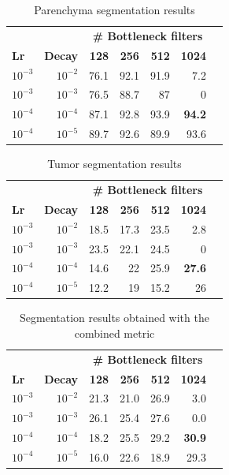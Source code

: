 \begin{table}[!htp]\centering
\caption{Parenchyma segmentation results}
\scriptsize
\begin{tabular}{lrrrrrr}\toprule
& &\multicolumn{4}{c}{\textbf{\# Bottleneck filters}} \\\cmidrule{3-6}
\textbf{Lr} &\textbf{Decay} &\textbf{128} &\textbf{256} &\textbf{512} &\textbf{1024} \\\midrule
$ 10^{-3} $ &$ 10^{-2} $ &76.1 &92.1 &91.9 &7.2 \\
$ 10^{-3} $ &$ 10^{-3} $ &76.5 &88.7 &87 &0 \\
$ 10^{-4} $ &$ 10^{-4} $ &87.1 &92.8 &93.9 &\textbf{94.2} \\
$ 10^{-4} $ &$ 10^{-5} $ &89.7 &92.6 &89.9 &93.6 \\
\bottomrule
\end{tabular}
\end{table}

\begin{table}[!htp]\centering
\caption{Tumor segmentation results}
\scriptsize
\begin{tabular}{lrrrrrr}\toprule
& &\multicolumn{4}{c}{\textbf{\# Bottleneck filters}} \\\cmidrule{3-6}
\textbf{Lr} &\textbf{Decay} &\textbf{128} &\textbf{256} &\textbf{512} &\textbf{1024} \\\midrule
$ 10^{-3} $ &$ 10^{-2} $ &18.5 &17.3 &23.5 &2.8 \\
$ 10^{-3} $ &$ 10^{-3} $ &23.5 &22.1 &24.5 &0 \\
$ 10^{-4} $ &$ 10^{-4} $ &14.6 &22 &25.9 &\textbf{27.6} \\
$ 10^{-4} $ &$ 10^{-5} $ &12.2 &19 &15.2 &26 \\
\bottomrule
\end{tabular}
\end{table}

\begin{table}[!htp]\centering
\caption{Segmentation results obtained with the combined metric}
\scriptsize
\begin{tabular}{lrrrrrr}\toprule
& &\multicolumn{4}{c}{\textbf{\# Bottleneck filters}} \\\cmidrule{3-6}
\textbf{Lr} &\textbf{Decay} &\textbf{128} &\textbf{256} &\textbf{512} &\textbf{1024} \\\midrule
$ 10^{-3} $ &$ 10^{-2} $ &21.3 &21.0 &26.9 &3.0 \\
$ 10^{-3} $ &$ 10^{-3} $ &26.1 &25.4 &27.6 &0.0 \\
$ 10^{-4} $ &$ 10^{-4} $ &18.2 &25.5 &29.2 &\textbf{30.9} \\
$ 10^{-4} $ &$ 10^{-5} $ &16.0 &22.6 &18.9 &29.3 \\
\bottomrule
\end{tabular}
\end{table}

